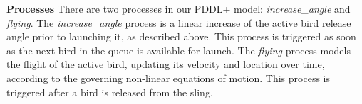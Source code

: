 \documentclass[letterpaper]{article} %
\begin{document}
\noindent\textbf{Processes}
There are two processes in our PDDL+ model: \textit{increase\_angle} and \textit{flying}.  The \textit{increase\_angle} process is a linear increase of the active bird release angle prior to launching it, as described above. This process is triggered as soon as the next bird in the queue is available for launch. %
The \textit{flying} process models the flight of the active bird, updating its velocity and location over time, according to the governing non-linear equations of motion. This process is triggered after a bird is released from the sling. %

\end{document}
